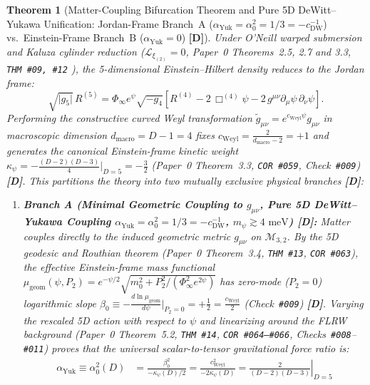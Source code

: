 \documentclass[11pt,a4paper]{article}
\newcommand{\catD}{\textbf{\textcolor{blue!75!black}{[D]}}}
\theoremstyle{plain}
\newtheorem{theorem}{Theorem}[section]
\theoremstyle{definition}
\theoremstyle{remark}
\numberwithin{equation}{section}
\begin{document}
\begin{theorem}[Matter-Coupling Bifurcation Theorem and Pure 5D DeWitt--Yukawa Unification: Jordan-Frame Branch~A ($\alpha_{\text{Yuk}} = \alpha_0^2 = 1/3 = -c_{\text{DW}}^{-1}$) vs.\ Einstein-Frame Branch~B ($\alpha_{\text{Yuk}} = 0$) \catD]
\label{thm:matter_coupling_fork}
Under O'Neill warped submersion and Kaluza cylinder reduction ($\mathcal{L}_{\xi_{(2)}} = 0$, \textit{Paper~0} Theorems~2.5, 2.7 and 3.3, \texttt{THM \#09, \#12} \cite{jimenez2026_p0}), the 5-dimensional Einstein--Hilbert density reduces to the Jordan frame:
\begin{equation}
  \sqrt{\lvert g_5\rvert}\,R^{(5)} = \Phi_{\infty}e^{\psi}\sqrt{-g_4}\left[R^{(4)} - 2\,\Box^{(4)}\psi - 2\,g^{\mu\nu}\partial_\mu\psi\,\partial_\nu\psi\right].
  \label{eq:jordan_frame_reduction_p3}
\end{equation}
Performing the constructive curved Weyl transformation $\tilde{g}_{\mu\nu} = e^{c_{\text{Weyl}}\psi}g_{\mu\nu}$ in macroscopic dimension $d_{\text{macro}} = D - 1 = 4$ fixes $c_{\text{Weyl}} = \frac{2}{d_{\text{macro}}-2} = +1$ and generates the canonical Einstein-frame kinetic weight $\kappa_{\psi} = -\frac{(D-2)(D-3)}{4}\big|_{D=5} = -\frac{3}{2}$ (\textit{Paper~0} Theorem~3.3, \texttt{COR \#059}, Check~\texttt{\#009}) \catD. This partitions the theory into two mutually exclusive physical branches \catD:
\begin{enumerate}
  \item[\textnormal{(i)}] \textbf{Branch A (Minimal Geometric Coupling to $g_{\mu\nu}$, Pure 5D DeWitt--Yukawa Coupling $\alpha_{\text{Yuk}} = \alpha_0^2 = 1/3 = -c_{\text{DW}}^{-1}$, $m_{\psi} \gtrsim 4\text{ meV}$) \catD:} Matter couples directly to the induced geometric metric $g_{\mu\nu}$ on $\mathcal{M}_{3,2}$. By the 5D geodesic and Routhian theorem (\textit{Paper~0} Theorem~3.4, \texttt{THM \#13}, \texttt{COR \#063}), the effective Einstein-frame mass functional $\mu_{\text{geom}}(\psi, P_2) = e^{-\psi/2}\sqrt{m_0^2 + P_2^2/(\Phi_{\infty}^2 e^{2\psi})}$ has zero-mode ($P_2 = 0$) logarithmic slope $\beta_0 \equiv -\frac{d\ln\mu_{\text{geom}}}{d\psi}\big|_{P_2=0} = +\frac{1}{2} = \frac{c_{\text{Weyl}}}{2}$ (Check~\texttt{\#009}) \catD. Varying the rescaled 5D action with respect to $\psi$ and linearizing around the FLRW background (\textit{Paper~0} Theorem~5.2, \texttt{THM \#14}, \texttt{COR \#064--\#066}, Checks~\texttt{\#008}--\texttt{\#011}) proves that the universal scalar-to-tensor gravitational force ratio is:
  \begin{align}
    \alpha_{\text{Yuk}} \equiv \alpha_0^2(D) &= \frac{\beta_0^2}{-\kappa_{\psi}(D)/2} = \frac{c_{\text{Weyl}}^2}{-2\kappa_{\psi}(D)} = \left.\frac{2}{(D-2)(D-3)}\right|_{D=5} \nonumber \\[3pt]

\end{align}
\end{enumerate}
\end{theorem}
\end{document}
